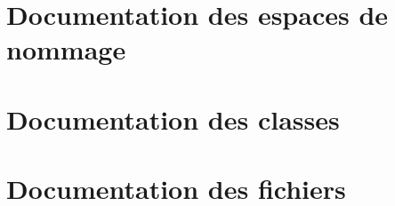 \documentclass[twoside]{book}
\newcommand{\+}{\discretionary{\mbox{\scriptsize$\hookleftarrow$}}{}{}}
\newcommand{\clearemptydoublepage}{%
    \newpage{\pagestyle{empty}\cleardoublepage}%
  }
\begin{document}
\chapter{Documentation des espaces de nommage}








\chapter{Documentation des classes}






















\chapter{Documentation des fichiers}





















  \backmatter
  \newpage
  \clearemptydoublepage
  \printindex
\end{document}

